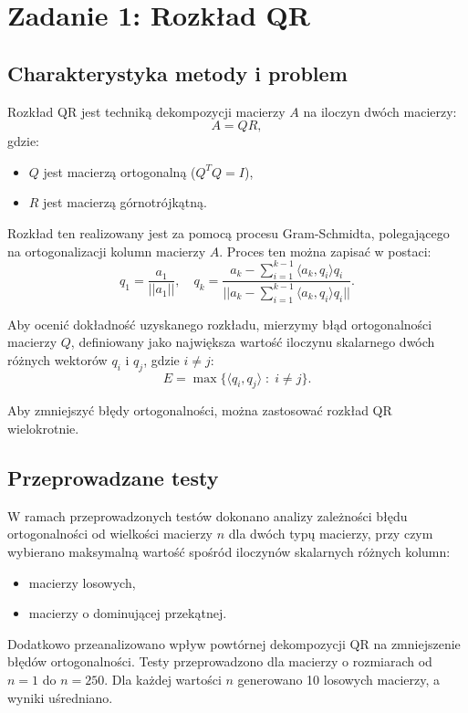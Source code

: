 \section{Zadanie 1: Rozkład QR}

\subsection{Charakterystyka metody i problem}

Rozkład QR jest techniką dekompozycji macierzy \( A \) na iloczyn dwóch macierzy:
\[
A = QR,
\]
gdzie:
\begin{itemize}
    \item \( Q \) jest macierzą ortogonalną (\( Q^T Q = I \)),
    \item \( R \) jest macierzą górnotrójkątną.
\end{itemize}

Rozkład ten realizowany jest za pomocą procesu Gram-Schmidta, polegającego na ortogonalizacji kolumn macierzy \( A \). Proces ten można zapisać w postaci:
\[
q_1 = \frac{a_1}{||a_1||}, \quad 
q_k = \frac{a_k - \sum_{i=1}^{k-1} \langle a_k, q_i \rangle q_i}{||a_k - \sum_{i=1}^{k-1} \langle a_k, q_i \rangle q_i||}.
\]

Aby ocenić dokładność uzyskanego rozkładu, mierzymy błąd ortogonalności macierzy \( Q \), definiowany jako największa wartość iloczynu skalarnego dwóch różnych wektorów \( q_i \) i \( q_j \), gdzie \( i \neq j \):
\[
E = \max\{\langle q_i, q_j \rangle \; : \; i \neq j\}.
\]

Aby zmniejszyć błędy ortogonalności, można zastosować rozkład QR wielokrotnie.

\subsection{Przeprowadzane testy}

W ramach przeprowadzonych testów dokonano analizy zależności błędu ortogonalności od wielkości macierzy \( n \) dla dwóch typų macierzy, przy czym wybierano maksymalną wartość spośród iloczynów skalarnych różnych kolumn:
\begin{itemize}
    \item macierzy losowych,
    \item macierzy o dominującej przekątnej.
\end{itemize}

Dodatkowo przeanalizowano wpływ powtórnej dekompozycji QR na zmniejszenie błędów ortogonalności. Testy przeprowadzono dla macierzy o rozmiarach od \( n = 1 \) do \( n = 250 \). Dla każdej wartości \( n \) generowano 10 losowych macierzy, a wyniki uśredniano.

